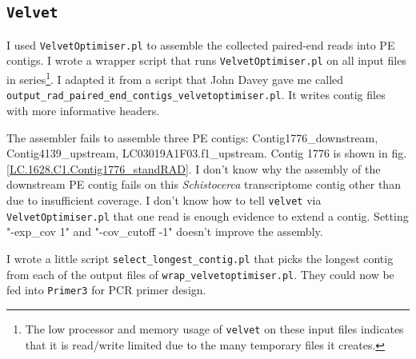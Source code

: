 \documentclass{article}\usepackage[]{graphicx}\usepackage[]{color}
\begin{document}

\subsection{\texttt{Velvet}}
I used \texttt{VelvetOptimiser.pl} to assemble the collected paired-end reads into PE contigs. I wrote a wrapper script that runs \texttt{VelvetOptimiser.pl} on all input files in series\footnote{The low processor and memory usage of \texttt{velvet} on these input files indicates that it is read/write limited due to the many temporary files it creates.}. I adapted it from a script that John Davey gave me called \texttt{output\_rad\_paired\_end\_contigs\_velvetoptimiser.pl}. It writes contig files with more informative headers.

The assembler fails to assemble three PE contigs: Contig1776\_downstream, Contig4139\_upstream, LC03019A1F03.f1\_upstream. Contig 1776 is shown in fig. \ref{LC.1628.C1.Contig1776_standRAD}. I don't know why the assembly of the downstream PE contig fails on this \textit{Schistocerca} transcriptome contig other than due to insufficient coverage. I don't know how to tell \texttt{velvet} via \texttt{VelvetOptimiser.pl} that one read is enough evidence to extend a contig. Setting "-exp\_cov 1" and "-cov\_cutoff -1" doesn't improve the assembly.

I wrote a little script \texttt{select\_longest\_contig.pl} that picks the longest contig from each of the output files of \texttt{wrap\_velvetoptimiser.pl}. They could now be fed into \texttt{Primer3} for PCR primer design.

\end{document}
